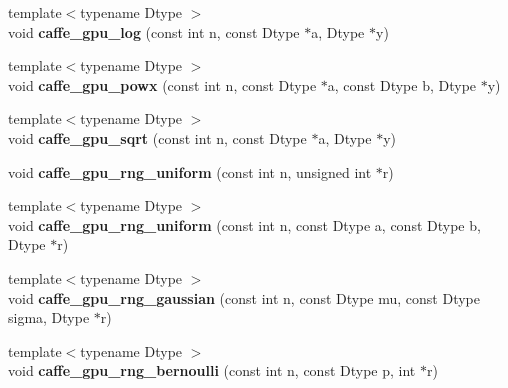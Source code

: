 \begin{DoxyCompactItemize}
\item 
{\footnotesize template$<$typename Dtype $>$ }\\void {\bfseries caffe\+\_\+gpu\+\_\+log} (const int n, const Dtype $\ast$a, Dtype $\ast$y)\hypertarget{namespacecaffe_a6adb76ec01137569f8bc453b86156106}{}\label{namespacecaffe_a6adb76ec01137569f8bc453b86156106}

\item 
{\footnotesize template$<$typename Dtype $>$ }\\void {\bfseries caffe\+\_\+gpu\+\_\+powx} (const int n, const Dtype $\ast$a, const Dtype b, Dtype $\ast$y)\hypertarget{namespacecaffe_a9ee33a72306ecb2f1b13e31e1a326d6b}{}\label{namespacecaffe_a9ee33a72306ecb2f1b13e31e1a326d6b}

\item 
{\footnotesize template$<$typename Dtype $>$ }\\void {\bfseries caffe\+\_\+gpu\+\_\+sqrt} (const int n, const Dtype $\ast$a, Dtype $\ast$y)\hypertarget{namespacecaffe_ac57c5b22f1e4ff67457c2870dc725bdc}{}\label{namespacecaffe_ac57c5b22f1e4ff67457c2870dc725bdc}

\item 
void {\bfseries caffe\+\_\+gpu\+\_\+rng\+\_\+uniform} (const int n, unsigned int $\ast$r)\hypertarget{namespacecaffe_aee22d10249c5dd157d15a79bb8891bf8}{}\label{namespacecaffe_aee22d10249c5dd157d15a79bb8891bf8}

\item 
{\footnotesize template$<$typename Dtype $>$ }\\void {\bfseries caffe\+\_\+gpu\+\_\+rng\+\_\+uniform} (const int n, const Dtype a, const Dtype b, Dtype $\ast$r)\hypertarget{namespacecaffe_ac0e8182d67a4b874c7f40296a39fb203}{}\label{namespacecaffe_ac0e8182d67a4b874c7f40296a39fb203}

\item 
{\footnotesize template$<$typename Dtype $>$ }\\void {\bfseries caffe\+\_\+gpu\+\_\+rng\+\_\+gaussian} (const int n, const Dtype mu, const Dtype sigma, Dtype $\ast$r)\hypertarget{namespacecaffe_a80f781efdcad87bea07d3d1b204e698b}{}\label{namespacecaffe_a80f781efdcad87bea07d3d1b204e698b}

\item 
{\footnotesize template$<$typename Dtype $>$ }\\void {\bfseries caffe\+\_\+gpu\+\_\+rng\+\_\+bernoulli} (const int n, const Dtype p, int $\ast$r)\hypertarget{namespacecaffe_a9764416ef2baad29883651f50c975c6c}{}\label{namespacecaffe_a9764416ef2baad29883651f50c975c6c}


\end{DoxyCompactItemize}
